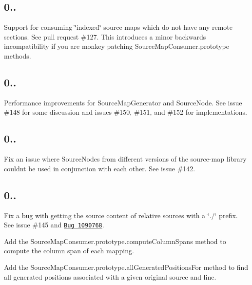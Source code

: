\subsection*{0..}


\begin{DoxyItemize}
\item Support for consuming \char`\"{}indexed\char`\"{} source maps which do not have any remote sections. See pull request \#127. This introduces a minor backwards incompatibility if you are monkey patching {\ttfamily Source\+Map\+Consumer.\+prototype} methods.
\end{DoxyItemize}

\subsection*{0..}


\begin{DoxyItemize}
\item Performance improvements for {\ttfamily Source\+Map\+Generator} and {\ttfamily Source\+Node}. See issue \#148 for some discussion and issues \#150, \#151, and \#152 for implementations.
\end{DoxyItemize}

\subsection*{0..}


\begin{DoxyItemize}
\item Fix an issue where {\ttfamily Source\+Node}s from different versions of the source-\/map library couldn\textquotesingle{}t be used in conjunction with each other. See issue \#142.
\end{DoxyItemize}

\subsection*{0..}


\begin{DoxyItemize}
\item Fix a bug with getting the source content of relative sources with a \char`\"{}./\char`\"{} prefix. See issue \#145 and \href{bugzil.la/1090768}{\tt Bug 1090768}.
\item Add the {\ttfamily Source\+Map\+Consumer.\+prototype.\+compute\+Column\+Spans} method to compute the column span of each mapping.
\item Add the {\ttfamily Source\+Map\+Consumer.\+prototype.\+all\+Generated\+Positions\+For} method to find all generated positions associated with a given original source and line.
\end{DoxyItemize}

